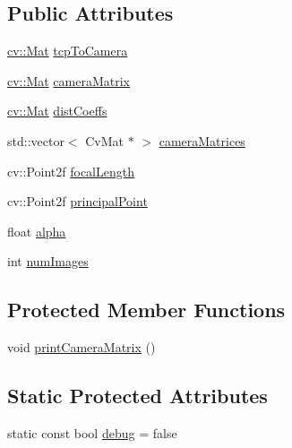 \subsection*{Public Attributes}
\begin{DoxyCompactItemize}
\item 
\hyperlink{namespacecv_a60d81b54f4914bec4cc4a72ab77eb444}{cv\-::\-Mat} \hyperlink{classsvl_c_c_d_l_r_calibration_file_i_o_ac4ceadd11cc10224168d3826060d7ceb}{tcp\-To\-Camera}
\item 
\hyperlink{namespacecv_a60d81b54f4914bec4cc4a72ab77eb444}{cv\-::\-Mat} \hyperlink{classsvl_c_c_d_l_r_calibration_file_i_o_a909b7fc4fc523ca0ce0b886ba3c094a0}{camera\-Matrix}
\item 
\hyperlink{namespacecv_a60d81b54f4914bec4cc4a72ab77eb444}{cv\-::\-Mat} \hyperlink{classsvl_c_c_d_l_r_calibration_file_i_o_a48b6994614586db7b2206f3da58ffe16}{dist\-Coeffs}
\item 
std\-::vector$<$ Cv\-Mat $\ast$ $>$ \hyperlink{classsvl_c_c_d_l_r_calibration_file_i_o_a4142b7141bcc1f152b1f1d21d8a6fc99}{camera\-Matrices}
\item 
cv\-::\-Point2f \hyperlink{classsvl_c_c_d_l_r_calibration_file_i_o_a2d3fdaada2b9dae1be3051a7df91148c}{focal\-Length}
\item 
cv\-::\-Point2f \hyperlink{classsvl_c_c_d_l_r_calibration_file_i_o_abc46a8c4ff95eaeded6947fd20a37b29}{principal\-Point}
\item 
float \hyperlink{classsvl_c_c_d_l_r_calibration_file_i_o_abc7c8f8276f79183ec8275c0dc3e976c}{alpha}
\item 
int \hyperlink{classsvl_c_c_d_l_r_calibration_file_i_o_aea95d20c4c61996153cb1ca3732f7f00}{num\-Images}
\end{DoxyCompactItemize}
\subsection*{Protected Member Functions}
\begin{DoxyCompactItemize}
\item 
void \hyperlink{classsvl_c_c_d_l_r_calibration_file_i_o_a6767deca13358d8a8e7ef5fd3cd43926}{print\-Camera\-Matrix} ()
\end{DoxyCompactItemize}
\subsection*{Static Protected Attributes}
\begin{DoxyCompactItemize}
\item 
static const bool \hyperlink{classsvl_c_c_d_l_r_calibration_file_i_o_a86495c1da7539fd80662b71d1e5ed7a3}{debug} = false
\end{DoxyCompactItemize}
